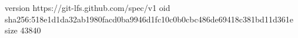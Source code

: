 version https://git-lfs.github.com/spec/v1
oid sha256:518e1d1da32ab1980facd0ba9946d1fc10c0b0cbc486de69418c381bd11d361e
size 43840
